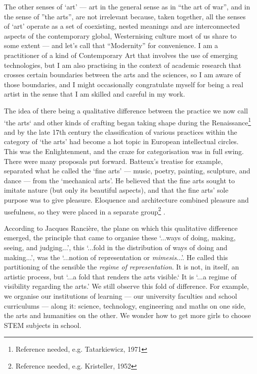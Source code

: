 \documentclass[letterpaper]{article}
\begin{document}
    The other senses of ‘art’ — art in the general sense as in “the art of war”, and in the sense of ”the arts”, are not irrelevant because, taken together, all the senses of ‘art’ operate as a set of coexisting, nested meanings and are interconnected aspects of the contemporary global, Westernising culture most of us share to some extent — and let's call that “Modernity” for convenience. I am a practitioner of a kind of Contemporary Art that involves the use of emerging technologies, but I am also practising in the context of academic research that crosses certain boundaries between the arts and the sciences, so I am aware of those boundaries, and I might occasionally congratulate myself for being a real artist in the sense that I am skilled and careful in my work.

    The idea of there being a qualitative difference between the practice we now call ‘the arts‘ and other kinds of crafting began taking shape during the Renaissance\footnote{Reference needed, e.g. Tatarkiewicz, 1971} and by the late 17th century the classification of various practices within the category of ‘the arts’ had become a hot topic in European intellectual circles. This was the Enlightenment, and the craze for categorisation was in full swing. There were many proposals put forward. Batteux’s treatise for example, separated what he called the ‘fine arts’ — music, poetry, painting, sculpture, and dance — from the ‘mechanical arts’. He believed that the fine arts sought to imitate nature (but only its beautiful aspects), and that the fine arts’ sole purpose was to give pleasure. Eloquence and architecture combined pleasure and usefulness, so they were placed in a separate group\footnote{Reference needed, e.g. Kristeller, 1952} \citep[p.632]{NadalSkovAFrwllTArt2020}.

    According to Jacques Rancière, the plane on which this qualitative difference emerged, the principle that came to organise these ‘...ways of doing, making, seeing, and judging...’, this ‘...fold in the distribution of ways of doing and making...’, was the ‘...notion of representation or \emph{mimesis}...’. He called this partitioning of the sensible the \emph{regime of representation}\citep[p.22]{RancierPltcsOfThAsthtcs2004}. It is not, in itself, an artistic process, but ‘...a fold that renders the arts visible.‘ It is  ‘...a regime of visibility regarding the arts.’ We still observe this fold of difference. For example, we organise our institutions of learning — our university faculties and school curriculums — along it: science, technology, engineering and maths on one side, the arts and humanities on the other. We wonder how to get more girls to choose STEM subjects in school.
\end{document}
